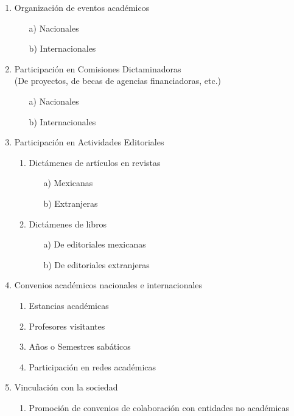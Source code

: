 \documentclass[12pt]{report}
\begin{document}
\begin{enumerate}
\begin{enumerate}
\begin{enumerate}
    	\end{enumerate}
 	\item Organización de eventos académicos
 		\begin{itemize}
 		\item[a)] Nacionales
		\item[b)] Internacionales \\
 		\end{itemize}
	\item Participación en Comisiones Dictaminadoras\\ {\small (De proyectos, de becas de agencias financiadoras, etc.)}
		\begin{itemize}
		\item[a)] Nacionales
		\item[b)] Internacionales \\
		\end{itemize}
	\item Participación en Actividades Editoriales
		\begin{enumerate}
		\item Dictámenes de artículos en revistas
			\begin{itemize}
			\item[a)] Mexicanas
			\item[b)] Extranjeras
			\end{itemize}
		\item Dictámenes de libros
			\begin{itemize}
			\item[a)] De editoriales mexicanas
			\item[b)] De editoriales extranjeras \\
			\end{itemize}
		\end{enumerate}
	\item Convenios académicos nacionales e internacionales
		\begin{enumerate}
		\item Estancias académicas
		\item Profesores visitantes
		\item Años o Semestres sabáticos
		\item Participación en redes académicas \\
		\end{enumerate}
	\item Vinculación con la sociedad
		\begin{enumerate}
		\item Promoción de convenios de colaboración con entidades no académicas

\end{enumerate}
\end{enumerate}
\end{enumerate}
\end{document}
